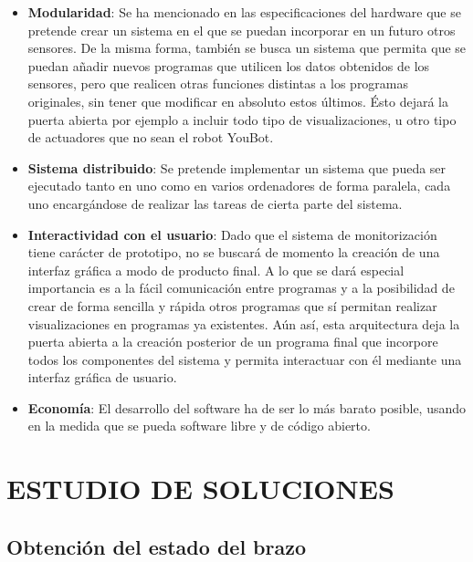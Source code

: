\documentclass[12pt, a4paper]{report}
\begin{document}
\begin{itemize}

\item \textbf{Modularidad}: Se ha mencionado en las especificaciones del hardware que se pretende crear un sistema en el que se puedan incorporar en un futuro otros sensores. De la misma forma, también se busca un sistema que permita que se puedan añadir nuevos programas que utilicen los datos obtenidos de los sensores, pero que realicen otras funciones distintas a los programas originales, sin tener que modificar en absoluto estos últimos. Ésto dejará la puerta abierta por ejemplo a incluir todo tipo de visualizaciones, u otro tipo de actuadores que no sean el robot YouBot.

\item \textbf{Sistema distribuido}: Se pretende implementar un sistema que pueda ser ejecutado tanto en uno como en varios ordenadores de forma paralela, cada uno encargándose de realizar las tareas de cierta parte del sistema. 

\item \textbf{Interactividad con el usuario}: Dado que el sistema de monitorización tiene carácter de prototipo, no se buscará de momento la creación de una interfaz gráfica a modo de producto final. A lo que se dará especial importancia es a la fácil comunicación entre programas y a la posibilidad de crear de forma sencilla y rápida otros programas que sí permitan realizar visualizaciones en programas ya existentes. Aún así, esta arquitectura deja la puerta abierta a la creación posterior de un programa final que incorpore todos los componentes del sistema y permita interactuar con él mediante una interfaz gráfica de usuario.

\item \textbf{Economía}: El desarrollo del software ha de ser lo más barato posible, usando en la medida que se pueda software libre y de código abierto.

\end{itemize}

\chapter{ESTUDIO DE SOLUCIONES}

\section{Obtención del estado del brazo}
\end{document}
